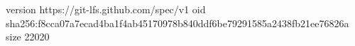 version https://git-lfs.github.com/spec/v1
oid sha256:f8cca07a7ecad4ba1f4ab45170978b840ddf6be79291585a2438fb21ee76826a
size 22020
